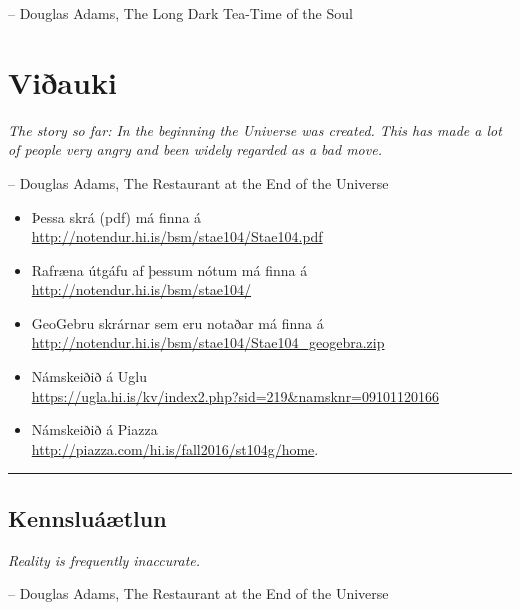 \documentclass[a4paper,10pt,icelandic]{sphinxmanual}
\begin{document}
-- Douglas Adams, The Long Dark Tea-Time of the Soul


\chapter{Viðauki}
\label{vidauki:viauki}\label{vidauki::doc}
\emph{The story so far:
In the beginning the Universe was created.
This has made a lot of people very angry and been widely regarded as a bad move.}

-- Douglas Adams, The Restaurant at the End of the Universe
\begin{itemize}

\item {} 
  Þessa skrá (pdf) má finna á \\ \url{http://notendur.hi.is/bsm/stae104/Stae104.pdf}

\item{} Rafræna útgáfu af þessum nótum má finna á \\
  \url{http://notendur.hi.is/bsm/stae104/}

\item {} 
GeoGebru skrárnar sem eru notaðar má finna á \\
\url{http://notendur.hi.is/bsm/stae104/Stae104_geogebra.zip}

\item {} 
Námskeiðið á Uglu \\
\url{https://ugla.hi.is/kv/index2.php?sid=219\&namsknr=09101120166}

\item {} 
Námskeiðið á Piazza \\ \url{http://piazza.com/hi.is/fall2016/st104g/home}.

\end{itemize}
\newpage

\bigskip\hrule{}\bigskip



\section{Kennsluáætlun}
\label{vidauki:kennsluaaetlun}
\emph{Reality is frequently inaccurate.}

-- Douglas Adams, The Restaurant at the End of the Universe
\end{document}
